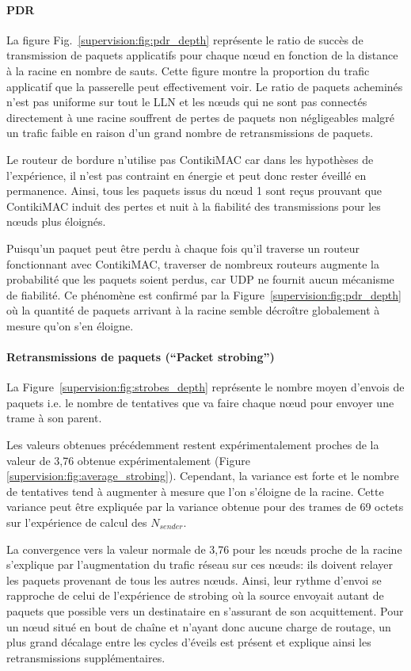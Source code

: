 \paragraph{\ac{PDR}}

La figure Fig.~\ref{supervision:fig:pdr_depth} représente le ratio de succès de transmission de paquets applicatifs pour chaque nœud en fonction de la distance à la racine en nombre de sauts.
Cette figure montre la proportion du trafic applicatif que la passerelle peut effectivement voir.
Le ratio de paquets acheminés n'est pas uniforme sur tout le \ac{LLN} et les nœuds qui ne sont pas connectés directement à une racine souffrent de pertes de paquets non négligeables malgré un trafic faible en raison d'un grand nombre de retransmissions de paquets.

Le routeur de bordure n'utilise pas ContikiMAC car dans les hypothèses de l'expérience, il n'est pas contraint en énergie et peut donc rester éveillé en permanence.
Ainsi, tous les paquets issus du nœud 1 sont reçus prouvant que ContikiMAC induit des pertes et nuit à la fiabilité des transmissions pour les nœuds plus éloignés.

Puisqu'un paquet peut être perdu à chaque fois qu'il traverse un routeur fonctionnant avec ContikiMAC, traverser de nombreux routeurs augmente la probabilité que les paquets soient perdus, car \ac{UDP} ne fournit aucun mécanisme de fiabilité.
Ce phénomène est confirmé par la Figure~\ref{supervision:fig:pdr_depth} où la quantité de paquets arrivant à la racine semble décroître globalement à mesure qu'on s'en éloigne.

\paragraph{Retransmissions de paquets (``Packet strobing'')}

La Figure~\ref{supervision:fig:strobes_depth} représente le nombre moyen d'envois de paquets i.e. le nombre de tentatives que va faire chaque nœud pour envoyer une trame à son parent.

Les valeurs obtenues précédemment restent expérimentalement proches de la valeur de 3,76 obtenue expérimentalement (Figure \ref{supervision:fig:average_strobing}).
Cependant, la variance est forte et le nombre de tentatives tend à augmenter à mesure que l'on s'éloigne de la racine.
Cette variance peut être expliquée par la variance obtenue pour des trames de 69 octets sur l'expérience de calcul des $N_{sender}$.

La convergence vers la valeur normale de 3,76 pour les nœuds proche de la racine s'explique par l'augmentation du trafic réseau sur ces nœuds: ils doivent relayer les paquets provenant de tous les autres nœuds.
Ainsi, leur rythme d'envoi se rapproche de celui de l'expérience de strobing où la source envoyait autant de paquets que possible vers un destinataire en s'assurant de son acquittement.
Pour un nœud situé en bout de chaîne et n'ayant donc aucune charge de routage, un plus grand décalage entre les cycles d'éveils est présent et explique ainsi les retransmissions supplémentaires.

